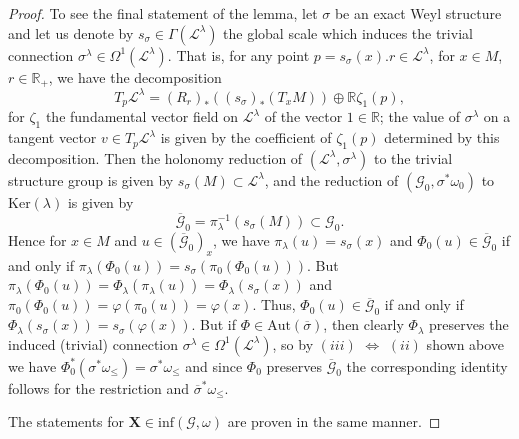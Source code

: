 \documentclass[11pt]{article}
\def\R{\mathbb{R}}
\def\Gbdle{\mathcal{G}}
\def\dsum{\oplus}
\theoremstyle{plain}
\theoremstyle{definition}
\begin{document}
\begin{proof}
 To see the f\/inal statement of the lemma, let $\sigma$ be an exact Weyl structure and let us denote by $s_{\sigma} \in \Gamma(\mathcal{L}^{\lambda})$ the global scale which induces the trivial connection $\sigma^{\lambda} \in \Omega^1(\mathcal{L}^{\lambda})$. That is, for any point $p = s_{\sigma}(x).r \in \mathcal{L}^{\lambda}$, for $x \in M$, $r \in \R_+$, we have the decomposition
\[
T_p \mathcal{L}^{\lambda} = (R_r)_*((s_{\sigma})_*(T_xM)) \dsum \R \zeta_1(p),
\]
for $\zeta_1$ the fundamental vector f\/ield on $\mathcal{L}^{\lambda}$ of the vector $1 \in \R$; the value of $\sigma^{\lambda}$ on a tangent vector $v \in T_p\mathcal{L}^{\lambda}$ is given by the coef\/f\/icient of $\zeta_1(p)$ determined by this decomposition. Then the holonomy reduction of $(\mathcal{L}^{\lambda},\sigma^{\lambda})$ to the trivial structure group is given by $s_{\sigma}(M) \subset \mathcal{L}^{\lambda}$, and the reduction of $(\Gbdle_0,\sigma^*\omega_0)$ to $\mathrm{Ker}(\lambda)$ is given by
\[
\overline{\Gbdle}_0 = \pi_{\lambda}^{-1}(s_{\sigma}(M)) \subset \Gbdle_0.
\]
Hence for $x \in M$ and $u \in (\overline{\Gbdle}_0)_x$, we have $\pi_{\lambda}(u) = s_{\sigma}(x)$ and $\Phi_0(u) \in \overline{\Gbdle}_0$ if and only if $\pi_{\lambda}(\Phi_0(u)) = s_{\sigma}(\pi_0(\Phi_0(u)))$. But $\pi_{\lambda}(\Phi_0(u)) = \Phi_{\lambda}(\pi_{\lambda}(u)) = \Phi_{\lambda}(s_{\sigma}(x))$ and $\pi_0(\Phi_0(u)) = \varphi(\pi_0(u)) = \varphi(x)$. Thus, $\Phi_0(u) \in \overline{\Gbdle}_0$ if and only if $\Phi_{\lambda}(s_{\sigma}(x)) = s_{\sigma}(\varphi(x))$. But if $\Phi \in \mathrm{Aut}(\overline{\sigma})$, then clearly $\Phi_{\lambda}$ preserves the induced (trivial) connection $\sigma^{\lambda} \in \Omega^1(\mathcal{L}^{\lambda})$, so by $(iii)$ $\Leftrightarrow$ $(ii)$ shown above we have $\Phi_0^*(\sigma^*\omega_{\leq}) = \sigma^*\omega_{\leq}$ and since $\Phi_0$ preserves $\overline{\Gbdle}_0$ the corresponding identity follows for the restriction and $\overline{\sigma}^*\omega_{\leq}$.

 The statements for $\mathbf{X} \in \mathrm{inf}(\Gbdle,\omega)$ are proven in the same manner.
 \end{proof}
\end{document}

